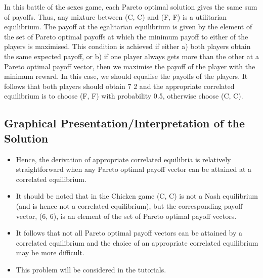 \documentclass[]{report}
\begin{document}
In this battle of the sexes game, each Pareto optimal solution gives
the same sum of payoffs. Thus, any mixture between (C, C) and
(F, F) is a utilitarian equilibrium.
The payoff at the egalitarian equilibrium is given by the element of
the set of Pareto optimal payoffs at which the minimum payoff to
either of the players is maximised.
This condition is achieved if either a) both players obtain the same
expected payoff, or b) if one player always gets more than the
other at a Pareto optimal payoff vector, then we maximise the
payoff of the player with the minimum reward.
In this case, we should equalise the payoffs of the players. It
follows that both players should obtain 7
2
and the appropriate
correlated equilibrium is to choose (F, F) with probability 0.5,
otherwise choose (C, C).

\subsection{Graphical Presentation/Interpretation of the Solution}
\begin{itemize}
	\item Hence, the derivation of appropriate correlated equilibria is
	relatively straightforward when any Pareto optimal payoff vector
	can be attained at a correlated equilibrium.
	\item	It should be noted that in the Chicken game (C, C) is not a Nash
	equilibrium (and is hence not a correlated equilibrium), but the
	corresponding payoff vector, (6, 6), is an element of the set of
	Pareto optimal payoff vectors.
	\item	It follows that not all Pareto optimal payoff vectors can be attained
	by a correlated equilibrium and the choice of an appropriate
	correlated equilibrium may be more difficult.
	\item	This problem will be considered in the tutorials.
\end{itemize}

\end{document}
